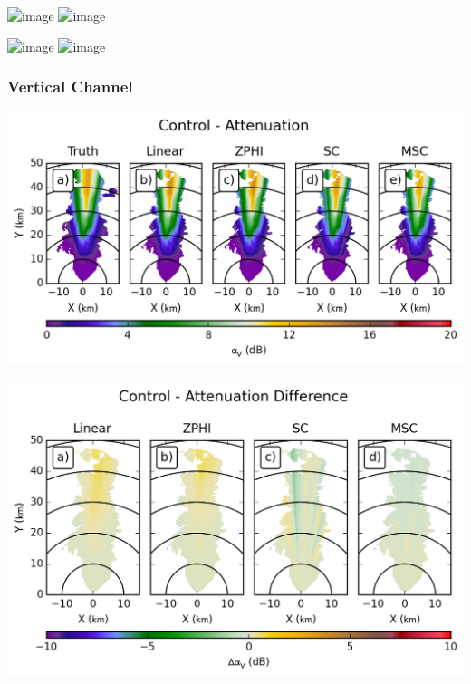\documentclass[red]{beamer}
\begin{document}
\begin{frame}
    \begin{center}
        \includegraphics<1>[scale=0.7]{figures/X_Combined_Differential_Attenuation_Difference}
        \includegraphics<2>[scale=0.7]{figures/X_Control_Differential_Attenuation_Difference}
    \end{center}
\end{frame}

\begin{frame}
    \begin{center}
        \includegraphics<1>[scale=0.7]{figures/X_Combined_Specific_Differential_Attenuation_scatter}
        \includegraphics<2>[scale=0.7]{figures/X_Control_Specific_Differential_Attenuation_scatter}
    \end{center}
\end{frame}

\subsubsection{Vertical Channel}
\begin{frame}
    \begin{center}
        \includegraphics[scale=0.7]{figures/C_Control_Attenuation_V}
    \end{center}
\end{frame}

\begin{frame}
    \begin{center}
        \includegraphics[scale=0.7]{figures/C_Control_Attenuation_Difference_V}
    \end{center}
\end{frame}
\end{document}
